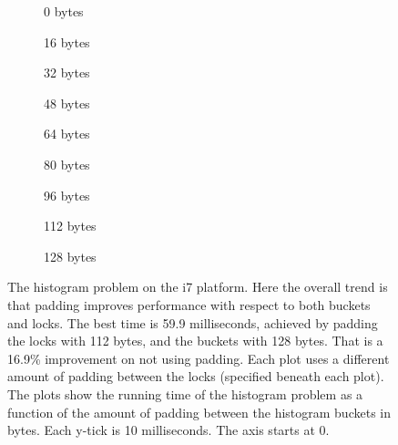 \begin{figure}[hbpt]
	\graphicspath{{plots/}}
	\begin{subfigure}{0.32\textwidth}
		
		\caption{0 bytes}
	\end{subfigure}
	\begin{subfigure}{0.32\textwidth}
		
		\caption{16 bytes}
	\end{subfigure}
	\begin{subfigure}{0.32\textwidth}
		
		\caption{32 bytes}
	\end{subfigure}
	\begin{subfigure}{0.32\textwidth}
		
		\caption{48 bytes}
	\end{subfigure}
	\begin{subfigure}{0.32\textwidth}
		
		\caption{64 bytes}
	\end{subfigure}
	\begin{subfigure}{0.32\textwidth}
		
		\caption{80 bytes}
	\end{subfigure}
	\begin{subfigure}{0.32\textwidth}
		
		\caption{96 bytes}
	\end{subfigure}
	\begin{subfigure}{0.32\textwidth}
		
		\caption{112 bytes}
	\end{subfigure}
	\begin{subfigure}{0.32\textwidth}
		
		\caption{128 bytes}
	\end{subfigure}
	\caption{The histogram problem on the i7 platform. Here the overall
	trend is that padding improves performance with respect to both buckets
	and locks. The best time is 59.9 milliseconds, achieved by padding the
	locks with 112 bytes, and the buckets with 128 bytes. That is a 16.9\%
	improvement on not using padding. Each plot uses a different amount of
	padding between the locks (specified beneath each plot). The plots show
	the running time of the histogram problem as a function of the amount of
	padding between the histogram buckets in bytes. Each y-tick is 10
	milliseconds. The axis starts at 0.} \label{fig:histo-local-i7}
\end{figure}

